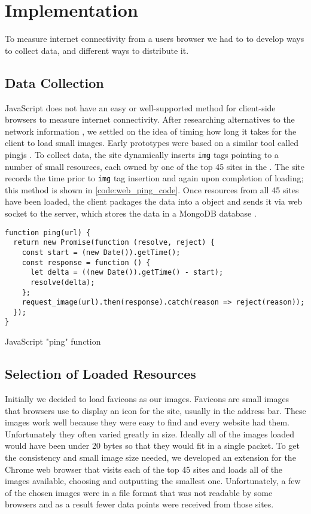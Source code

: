\section{Implementation}\label{sec:web_ping_impl}

To measure internet connectivity from a users browser we had to to develop ways to collect data, and different ways to distribute it.

\subsection{Data Collection}
JavaScript does not have an easy or well-supported method for client-side browsers to measure internet connectivity. After researching alternatives to the network information \api, we settled on the idea of timing how long it takes for the client to load small images. Early prototypes were based on a similar tool called pingjs \cite{Frederic2016a}. To collect data, the site dynamically inserts \html \texttt{img} tags pointing to a number of small resources, each owned by one of the top 45 sites in the \us. The site records the time prior to \texttt{img} tag insertion and again upon completion of loading; this method is shown in \cref{code:web_ping_code}. Once resources from all 45 sites have been loaded, the client packages the data into a \json object and sends it via web socket to the server, which stores the data in a MongoDB database \cite{MongoDB2019a}. 

\begin{code}[h]
    \centering
    \small
    \begin{verbatim}
function ping(url) {
  return new Promise(function (resolve, reject) {
    const start = (new Date()).getTime();
    const response = function () {
      let delta = ((new Date()).getTime() - start);
      resolve(delta);
    };
    request_image(url).then(response).catch(reason => reject(reason));
  });
}
    \end{verbatim}
    \caption{JavaScript "ping" function}
    \label{code:web_ping_code}
\end{code}


\subsection{Selection of Loaded Resources}
Initially we decided to load favicons as our images. Favicons are small images that browsers use to display an icon for the site, usually in the address bar. These images work well because they were easy to find and every website had them. Unfortunately they often varied greatly in size. Ideally all of the images loaded would have been under 20 bytes so that they would fit in a single \tcp packet. To get the consistency and small image size needed, we developed an extension for the Chrome web browser that visits each of the top 45 sites and loads all of the images available, choosing and outputting the smallest one. Unfortunately, a few of the chosen images were in a file format that was not readable by some browsers and as a result fewer data points were received from those sites.

